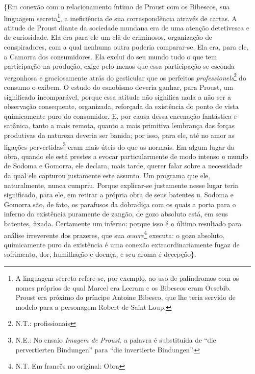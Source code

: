 \{Em conexão com o relacionamento íntimo de Proust com os Bibescos, sua
linguagem secreta\footnote{A linguagem secreta refere-se, por exemplo,
  ao uso de palíndromos com os nomes próprios de qual Marcel era Lecram
  e os Bibescos eram Ocsebib. Proust era próximo do príncipe Antoine
  Bibesco, que lhe teria servido de modelo para a personagem Robert de
  Saint-Loup.}, a ineficiência de sua correspondência através de cartas.
A atitude de Proust diante da sociedade mundana era de uma atenção
detetivesca e de curiosidade. Ela era para ele um clã de criminosos,
organização de conspiradores, com a qual nenhuma outra poderia
comparar-se. Ela era, para ele, a Camorra dos consumidores. Ela exclui
do seu mundo tudo o que tem participação na produção, exige pelo menos
que essa participação se esconda vergonhosa e graciosamente atrás do
gesticular que os perfeitos \emph{professionels}\footnote{N.T.:
  profissionais} do consumo o exibem. O estudo do esnobismo deveria
ganhar, para Proust, um significado incomparável, porque essa atitude
não significa nada a não ser a observação consequente, organizada,
reforçada da existência do ponto de vista quimicamente puro do
consumidor. E, por causa dessa encenação fantástica e satânica, tanto a
mais remota, quanto a mais primitiva lembrança das forças produtivas da
natureza deveria ser banida; por isso, para ele, até no amor as ligações
pervertidas\footnote{N.E.: No ensaio \emph{Imagem de Proust}, a palavra
  é substituída de ``die pervertierten Bindungen'' para ``die
  invertierte Bindungen''.} eram mais úteis do que as normais. Em algum
lugar da obra, quando ele está prestes a evocar particularmente de modo
intenso o mundo de Sodoma e Gomorra, ele declara, mais tarde, querer
falar sobre a necessidade da qual ele capturou justamente este assunto.
Um programa que ele, naturalmente, nunca cumpriu. Porque explicar-se
justamente nesse lugar teria significado, para ele, em retirar a própria
obra de seus batentes u. Sodoma e Gomorra são, de fato, os parafusos da
dobradiça com os quais a porta para o inferno da existência puramente de
zangão, de gozo absoluto está, em seus batentes, fixada. Certamente um
inferno: porque isso é o último resultado para análise irreverente dos
prazeres, que sua \emph{œuvre}\footnote{N.T. Em francês no original:
  Obra} executa: o gozo absoluto, quimicamente puro da existência é uma
conexão extraordinariamente fugaz de sofrimento, dor, humilhação e
doença, e seu aroma é decepção\}.

